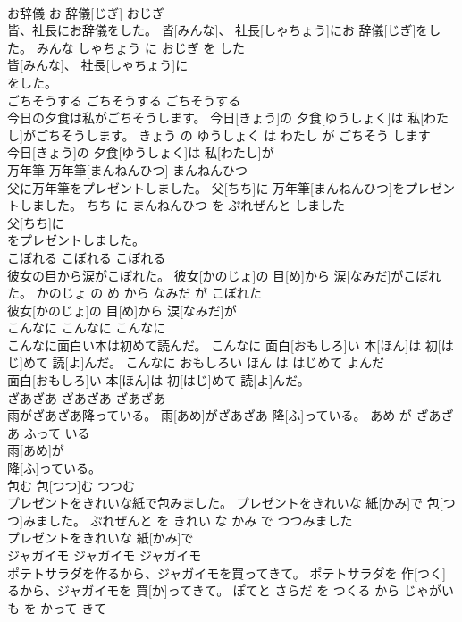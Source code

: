 \documentclass[8pt]{extreport}
\begin{document}
\begin{CJK}{UTF8}{min}
\\	お辞儀	お 辞儀[じぎ]	おじぎ	
\\	皆、社長にお辞儀をした。	皆[みんな]、 社長[しゃちょう]にお 辞儀[じぎ]をした。	みんな しゃちょう に おじぎ を した	
\\	皆[みんな]、 社長[しゃちょう]に
\\	をした。			
\\	ごちそうする	ごちそうする	ごちそうする	
\\	今日の夕食は私がごちそうします。	今日[きょう]の 夕食[ゆうしょく]は 私[わたし]がごちそうします。	きょう の ゆうしょく は わたし が ごちそう します	
\\	今日[きょう]の 夕食[ゆうしょく]は 私[わたし]が
\\	万年筆	万年筆[まんねんひつ]	まんねんひつ	
\\	父に万年筆をプレゼントしました。	父[ちち]に 万年筆[まんねんひつ]をプレゼントしました。	ちち に まんねんひつ を ぷれぜんと しました	
\\	父[ちち]に
\\	をプレゼントしました。			
\\	こぼれる	こぼれる	こぼれる	
\\	彼女の目から涙がこぼれた。	彼女[かのじょ]の 目[め]から 涙[なみだ]がこぼれた。	かのじょ の め から なみだ が こぼれた	
\\	彼女[かのじょ]の 目[め]から 涙[なみだ]が
\\	こんなに	こんなに	こんなに	
\\	こんなに面白い本は初めて読んだ。	こんなに 面白[おもしろ]い 本[ほん]は 初[はじ]めて 読[よ]んだ。	こんなに おもしろい ほん は はじめて よんだ	
\\	面白[おもしろ]い 本[ほん]は 初[はじ]めて 読[よ]んだ。			
\\	ざあざあ	ざあざあ	ざあざあ	
\\	雨がざあざあ降っている。	雨[あめ]がざあざあ 降[ふ]っている。	あめ が ざあざあ ふって いる	
\\	雨[あめ]が
\\	降[ふ]っている。			
\\	包む	包[つつ]む	つつむ	
\\	プレゼントをきれいな紙で包みました。	プレゼントをきれいな 紙[かみ]で 包[つつ]みました。	ぷれぜんと を きれい な かみ で つつみました	
\\	プレゼントをきれいな 紙[かみ]で
\\	ジャガイモ	ジャガイモ	ジャガイモ	
\\	ポテトサラダを作るから、ジャガイモを買ってきて。	ポテトサラダを 作[つく]るから、ジャガイモを 買[か]ってきて。	ぽてと さらだ を つくる から じゃがいも を かって きて	

\end{CJK}
\end{document}
